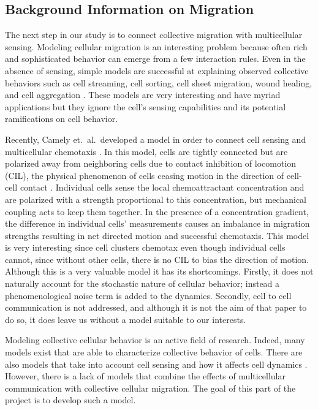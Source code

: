 \documentclass[phys,prelim]{puthesis}
\begin{document}
\subsection{Background Information on Migration}

The next step in our study is to connect collective migration with multicellular sensing. Modeling cellular migration is an interesting problem because often rich and sophisticated behavior can emerge from a few interaction rules. Even in the absence of sensing, simple models are successful at explaining observed collective behaviors such as cell streaming, cell sorting, cell sheet migration, wound healing, and cell aggregation \cite{kabla2012collective,szabo2010collective,basan2013alignment,janulevicius2015short}. These models are very interesting and have myriad applications but they ignore the cell's sensing capabilities and its potential ramifications on cell behavior.

Recently, Camely et.\ al.\ developed a model in order to connect cell sensing and multicellular chemotaxis \cite{camley2015emergent}. In this model, cells are tightly connected but are polarized away from neighboring cells due to contact inhibition of locomotion (CIL), the physical phenomenon of cells ceasing motion in the direction of cell-cell contact \cite{mayor2010keeping}. Individual cells sense the local chemoattractant concentration and are polarized with a strength proportional to this concentration, but mechanical coupling acts to keep them together. In the presence of a concentration gradient, the difference in individual cells' measurements causes an imbalance in migration strengths resulting in net directed motion and successful chemotaxis. This model is very interesting since cell clusters chemotax even though individual cells cannot, since without other cells, there is no CIL to bias the direction of motion. Although this is a very valuable model it has its shortcomings. Firstly, it does not naturally account for the stochastic nature of cellular behavior; instead a phenomenological noise term is added to the dynamics. Secondly, cell to cell communication is not addressed, and although it is not the aim of that paper to do so, it does leave us without a model suitable to our interests.

Modeling collective cellular behavior is an active field of research. Indeed, many models exist that are able to characterize collective behavior of cells. There are also models that take into account cell sensing and how it affects cell dynamics \cite{coburn2013tactile,camley2015emergent}. However, there is a lack of models that combine the effects of multicellular communication with collective cellular migration. The goal of this part of the project is to develop such a model.
\end{document}
